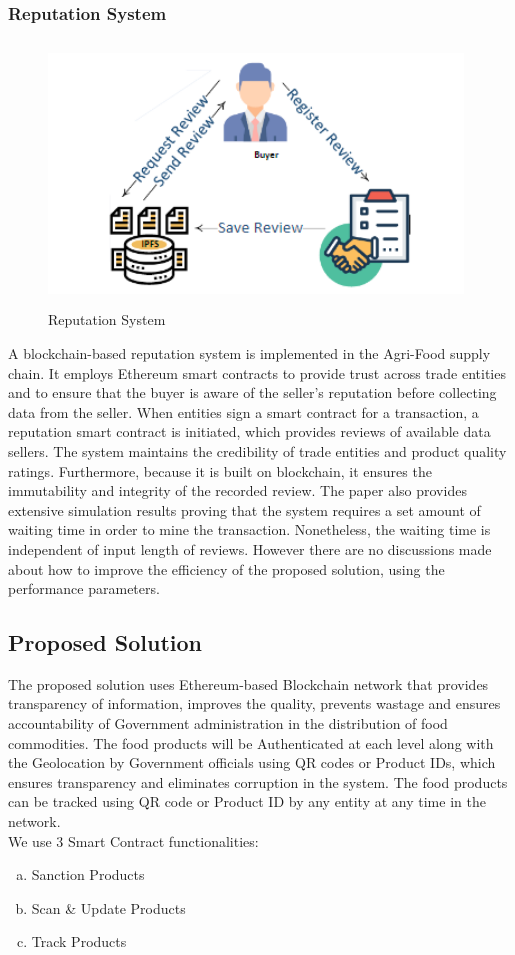 \documentclass[12pt,a4paper,twocolumn,fleqn]{article}
\begin{document}
\subsubsection{Reputation System}
\begin{figure} [H]
\includegraphics[width=11cm,height=7cm]{media/Reputation_System.png}
\centering
\caption{Reputation System}
\end{figure}
A blockchain-based reputation system is implemented in the Agri-Food supply chain.  It employs Ethereum smart contracts to provide trust across trade entities and to ensure that the buyer is aware of the seller's reputation before collecting data from the seller. When entities sign a smart contract for a transaction, a reputation smart contract is initiated, which provides reviews of available data sellers. The system maintains the credibility of trade entities and product quality ratings. Furthermore, because it is built on blockchain, it ensures the immutability and integrity of the recorded review. The paper also provides extensive simulation results proving that the system requires a set amount of waiting time in order to mine the transaction. Nonetheless, the waiting time is independent of input length of reviews. However there are no discussions made about how to improve the efficiency of the proposed solution, using the performance parameters. \\
\subsection{Proposed Solution}
The proposed solution uses Ethereum-based Blockchain network that provides transparency of information, improves the quality, prevents wastage and ensures accountability of Government administration in the distribution of food commodities. The food products will be Authenticated at each level along with the Geolocation by Government officials using QR codes or Product IDs, which ensures transparency and eliminates corruption in the system. The food products can be tracked using QR code or Product ID by any entity at
any time in the network. \\
We use 3 Smart Contract functionalities:
\begin{enumerate}[a)] %
    \item Sanction Products
    \item Scan \& Update Products
    \item Track Products
\end{enumerate}
\end{document}
